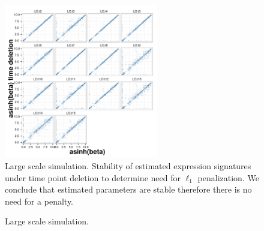 \begin{figure}
  \centering
  \includegraphics[width=0.6\textwidth]{pics/no-pen-sim.pdf}
  \caption{Large scale simulation. Stability of estimated expression signatures under time point deletion to determine need for $\ell_1$ penalization. We conclude that estimated parameters are stable therefore there is no need for a penalty.}
  \label{fig:lrg-sim-stab-l1}
\end{figure}

\begin{figure}
  \centering
  \caption{Large scale simulation. }
  \label{fig:lrg-sim-k-m}
\end{figure}

